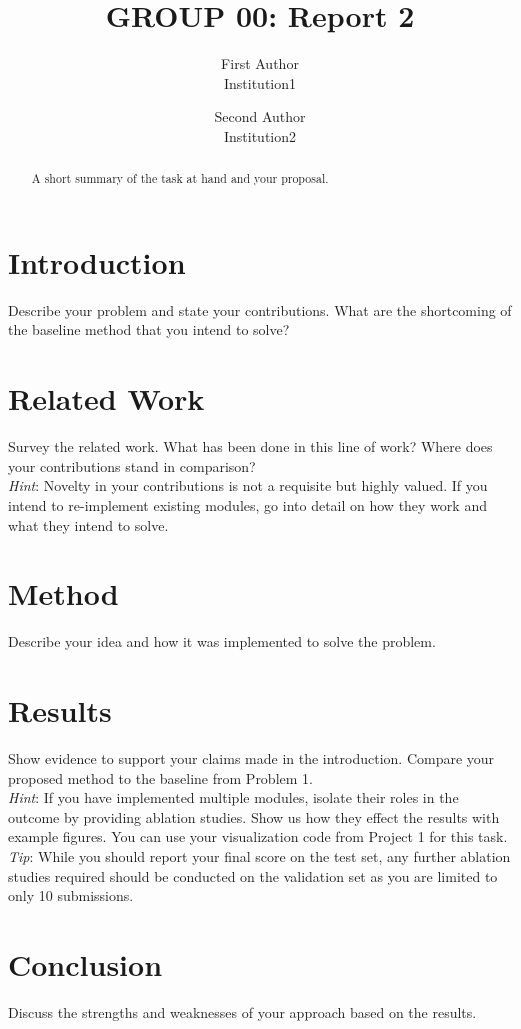 \documentclass[10pt,twocolumn,letterpaper]{article}
\begin{document}
\title{GROUP 00: Report 2}

\author{First Author\\
Institution1
\and
Second Author\\
Institution2
}
\maketitle

\begin{abstract}
A short summary of the task at hand and your proposal.
\end{abstract}

\section{Introduction}
\label{sec:intro}
Describe your problem and state your contributions. What are the shortcoming of the baseline method that you intend to solve?

\section{Related Work}
\label{sec:rw}
Survey the related work. What has been done in this line of work? Where does your contributions stand in comparison? \\
\noindent \textit{Hint}: Novelty in your contributions is not a requisite but highly valued. If you intend to re-implement existing modules, go into detail on how they work and what they intend to solve.

\section{Method}
\label{sec:method}
Describe your idea and how it was implemented to solve the problem.

\section{Results}
\label{sec:experiments}
Show evidence to support your claims made in the introduction. Compare your proposed method to the baseline from Problem 1. \\
\noindent \textit{Hint}: If you have implemented multiple modules, isolate their roles in the outcome by providing ablation studies. Show us how they effect the results with example figures. You can use your visualization code from Project 1 for this task.
\noindent \textit{Tip}: While you should report your final score on the test set, any further ablation studies required should be conducted on the validation set as you are limited to only 10 submissions.

\section{Conclusion}
\label{sec:conc}
Discuss the strengths and weaknesses of your approach based on the results.

{\small


}
\end{document}
